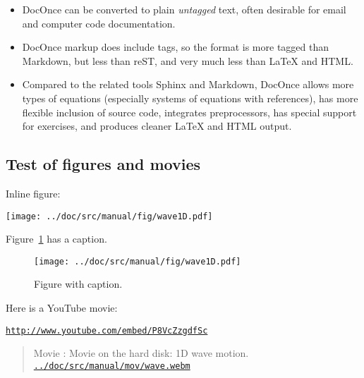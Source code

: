 \documentclass[%
oneside,                 %
final,                   %
10pt]{article}
\newenvironment{doconce:movie}{}{}
\newcounter{doconce:movie:counter}
\begin{document}
\begin{itemize}
  \item DocOnce can be converted to plain \emph{untagged} text,
    often desirable for email and computer code documentation.

  \item DocOnce markup does include tags, so the format is more tagged than
    Markdown, but less than reST, and very much less than
    {\LaTeX} and HTML.

  \item Compared to the related tools Sphinx and Markdown, DocOnce
    allows more types of equations (especially systems of
    equations with references), has more flexible
    inclusion of source code, integrates preprocessors, has
    special support for exercises, and produces
    cleaner {\LaTeX} and HTML output.
\end{itemize}

\noindent
\subsection{Test of figures and movies}

Inline figure:



\vspace{6mm}

\centerline{\texttt{[image: ../doc/src/manual/fig/wave1D.pdf]}}

\vspace{6mm}



Figure~\ref{fig1} has a caption.


\begin{figure}[!ht]  %
  \centerline{\texttt{[image: ../doc/src/manual/fig/wave1D.pdf]}}
  \caption{
  Figure with caption. \label{fig1}
  }
\end{figure}


Here is a YouTube movie:


\begin{doconce:movie}
\begin{center}
\href{{http://www.youtube.com/embed/P8VcZzgdfSc}}{\nolinkurl{http://www.youtube.com/embed/P8VcZzgdfSc}}
\end{center}
\end{doconce:movie}



\begin{doconce:movie}
\begin{quote}
Movie : Movie on the hard disk: 1D wave motion. \href{run:../doc/src/manual/mov/wave.webm}{\nolinkurl{../doc/src/manual/mov/wave.webm}}
\end{quote}
\end{doconce:movie}
\end{document}
